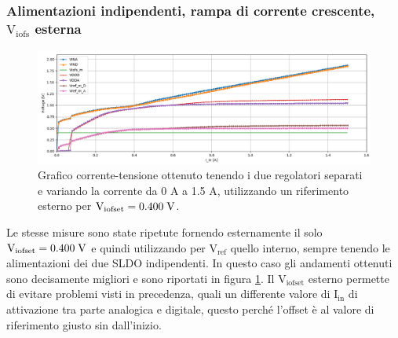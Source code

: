 \subsubsection{Alimentazioni indipendenti, rampa di corrente crescente, $\mathrm{V_{iofs}}$ esterna} 
\begin{figure}
\centering
\includegraphics[width=\textwidth]{Immagini/IUEViofs2}
\caption{Grafico corrente-tensione ottenuto tenendo i due regolatori separati e variando la corrente da 0 A a 1.5 A, utilizzando un riferimento esterno per $\mathrm{V_{iofset}}=0.400 \rm \; V$.}
\label{IUEViofs}
\end{figure}
Le stesse misure sono state ripetute fornendo esternamente il solo $\mathrm{V_{iofset}}=0.400 \rm \; V$ e quindi utilizzando per $\mathrm{V_{ref}}$ quello interno, sempre tenendo le alimentazioni dei due SLDO indipendenti. 
In questo caso gli andamenti ottenuti sono decisamente migliori e sono riportati in figura \ref{IUEViofs}. 
Il $\mathrm{V_{iofset}}$ esterno permette di evitare problemi visti in precedenza, quali un differente valore di $\mathrm{I_{in}}$ di attivazione tra parte analogica e digitale, questo perché l'offset è al valore di riferimento giusto sin dall'inizio.
% 
%
%


